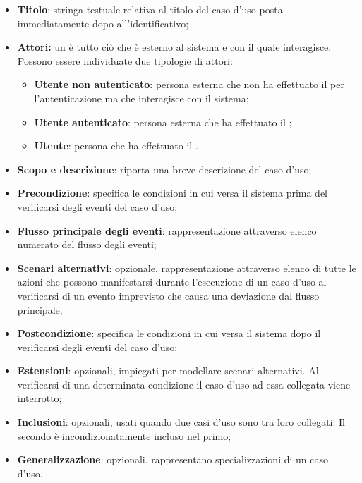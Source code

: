                 \begin{itemize}
                    \item\textbf{Titolo}: stringa testuale relativa al titolo del caso d’uso posta immediatamente dopo all’identificativo;
                    \item\textbf{Attori:} un  è tutto ciò che è esterno al sistema e con il quale interagisce. \\
                        Possono essere individuate due tipologie di attori:
                        \begin{itemize}
                            \item\textbf{Utente non autenticato}: persona esterna che non ha effettuato il  per l’autenticazione ma che interagisce con il sistema;
                            \item\textbf{Utente autenticato}: persona esterna che ha effettuato il ;
                            \item\textbf{Utente}: persona che ha effettuato il .
                        \end{itemize}
                    \item\textbf{Scopo e descrizione}: riporta una breve descrizione del caso d’uso;
                    \item\textbf{Precondizione}: specifica le condizioni in cui versa il sistema prima del verificarsi degli eventi del caso d’uso;
                    \item\textbf{Flusso principale degli eventi}: rappresentazione attraverso elenco numerato del flusso degli eventi;
                    \item\textbf{Scenari alternativi}: opzionale, rappresentazione attraverso elenco di tutte le azioni che possono manifestarsi durante l’esecuzione di un caso d’uso al verificarsi di un evento imprevisto che causa una deviazione dal flusso principale;
                    \item\textbf{Postcondizione}: specifica le condizioni in cui versa il sistema dopo il verificarsi degli eventi del caso d’uso;
                    \item\textbf{Estensioni}: opzionali, impiegati per modellare scenari alternativi. Al verificarsi di una determinata condizione il caso d’uso ad essa collegata viene interrotto;
                    \item\textbf{Inclusioni}: opzionali, usati quando due casi d’uso sono tra loro collegati. Il secondo è incondizionatamente incluso nel primo;
                    \item\textbf{Generalizzazione}: opzionali, rappresentano specializzazioni di un caso d’uso.
                \end{itemize}
